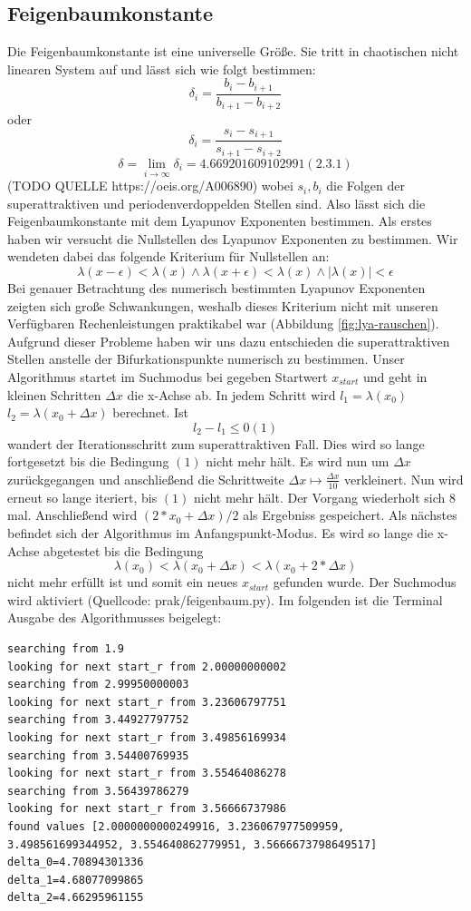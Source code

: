 \documentclass{scrartcl}
\begin{document}
\subsection{Feigenbaumkonstante}
Die Feigenbaumkonstante ist eine universelle Größe. Sie tritt in chaotischen nicht linearen System auf und lässt sich wie folgt bestimmen:
$$\delta_i = \frac{b_i-b_{i+1}}{b_{i+1}-b_{i+2}}$$ oder $$\delta_i = \frac{s_i-s_{i+1}}{s_{i+1}-s_{i+2}}$$
$$\delta = \lim\limits_{i \rightarrow \infty}{\delta_i} = 4.669201609102991 (2.3.1) $$ (TODO QUELLE https://oeis.org/A006890)
wobei $s_i, b_i$ die Folgen der superattraktiven und periodenverdoppelden Stellen sind.
Also lässt sich die Feigenbaumkonstante mit dem Lyapunov Exponenten bestimmen. 
Als erstes haben wir versucht die Nullstellen des Lyapunov Exponenten zu bestimmen. Wir wendeten dabei das folgende Kriterium für Nullstellen an:
$$\lambda(x-\epsilon) < \lambda(x) \wedge \lambda(x+\epsilon) < \lambda(x) \wedge |\lambda(x)|<\epsilon$$
Bei genauer Betrachtung des numerisch bestimmten Lyapunov Exponenten zeigten sich große Schwankungen, weshalb dieses Kriterium nicht mit unseren Verfügbaren Rechenleistungen praktikabel war (Abbildung \ref{fig:lya-rauschen}).
Aufgrund dieser Probleme
haben wir uns dazu entschieden die superattraktiven Stellen anstelle der Bifurkationspunkte numerisch zu bestimmen. Unser Algorithmus startet im Suchmodus bei gegeben Startwert $x_{start}$ und geht in kleinen Schritten $\Delta x$ die x-Achse ab. In jedem Schritt wird $l_1=\lambda(x_0)$ $l_2=\lambda(x_0 + \Delta x)$ berechnet. 
Ist
$$l_2-l_1 \leq 0 (1) $$
wandert der Iterationsschritt zum superattraktiven Fall. 
Dies wird so lange fortgesetzt bis die Bedingung $(1)$ nicht mehr hält. 
Es wird nun um $\Delta x$ zurückgegangen und anschließend die Schrittweite $\Delta x \mapsto \frac{\Delta x}{10} $ verkleinert. Nun wird erneut so lange iteriert, bis $(1)$ nicht mehr hält. 
Der Vorgang wiederholt sich 8 mal. Anschließend wird $(2*x_0 + \Delta x )/2$ als Ergebniss gespeichert. 
Als nächstes befindet sich der Algorithmus im Anfangspunkt-Modus. Es wird so lange die x-Achse abgetestet bis die Bedingung 
$$\lambda(x_0) < \lambda(x_0 + \Delta x) < \lambda(x_0 + 2*\Delta x)$$
nicht mehr erfüllt ist und somit ein neues $x_{start}$ gefunden wurde. Der Suchmodus wird aktiviert  (Quellcode: prak/feigenbaum.py).
Im folgenden ist die Terminal Ausgabe des Algorithmusses beigelegt:
\begin{lstlisting}
searching from 1.9
looking for next start_r from 2.00000000002
searching from 2.99950000003
looking for next start_r from 3.23606797751
searching from 3.44927797752
looking for next start_r from 3.49856169934
searching from 3.54400769935
looking for next start_r from 3.55464086278
searching from 3.56439786279
looking for next start_r from 3.56666737986
found values [2.0000000000249916, 3.236067977509959, 3.498561699344952, 3.554640862779951, 3.5666673798649517]
delta_0=4.70894301336
delta_1=4.68077099865
delta_2=4.66295961155
\end{lstlisting}
\end{document}
